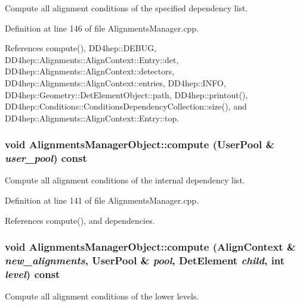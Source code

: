 Compute all alignment conditions of the specified dependency list. 

Definition at line 146 of file AlignmentsManager.cpp.

References compute(), DD4hep::DEBUG, DD4hep::Alignments::AlignContext::Entry::det, DD4hep::Alignments::AlignContext::detectors, DD4hep::Alignments::AlignContext::entries, DD4hep::INFO, DD4hep::Geometry::DetElementObject::path, DD4hep::printout(), DD4hep::Conditions::ConditionsDependencyCollection::size(), and DD4hep::Alignments::AlignContext::Entry::top.\hypertarget{class_d_d4hep_1_1_alignments_1_1_alignments_manager_object_af49fc575ee0f8340b2655fd0dab17cbb}{
\subsubsection[{compute}]{\setlength{\rightskip}{0pt plus 5cm}void AlignmentsManagerObject::compute (UserPool \& {\em user\_\-pool}) const}}
\label{class_d_d4hep_1_1_alignments_1_1_alignments_manager_object_af49fc575ee0f8340b2655fd0dab17cbb}


Compute all alignment conditions of the internal dependency list. 

Definition at line 141 of file AlignmentsManager.cpp.

References compute(), and dependencies.\hypertarget{class_d_d4hep_1_1_alignments_1_1_alignments_manager_object_aa1b340adcf40221ef1e07ca6e297660f}{
\subsubsection[{compute}]{\setlength{\rightskip}{0pt plus 5cm}void AlignmentsManagerObject::compute ({\bf AlignContext} \& {\em new\_\-alignments}, \/  UserPool \& {\em pool}, \/  {\bf DetElement} {\em child}, \/  int {\em level}) const}}
\label{class_d_d4hep_1_1_alignments_1_1_alignments_manager_object_aa1b340adcf40221ef1e07ca6e297660f}


Compute all alignment conditions of the lower levels. 

